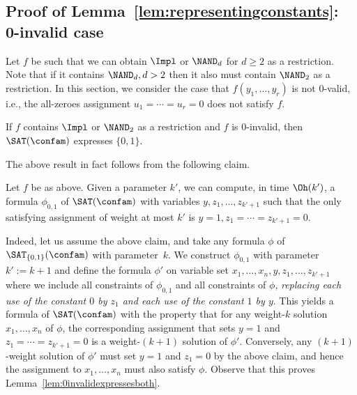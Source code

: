 \subsection{Proof of Lemma~\ref{lem:representingconstants}: 0-invalid case}
\label{sec:0invalid}
%
%
Let $f$ be such that we can obtain $\Impl$ or $\NAND_d$ for $d\ge 2$ as a restriction. Note that if it contains $\NAND_{d},d>2$ then it also must contain $\NAND_2$ as a restriction. 
%
In this section, we consider the case that $f(y_1,\dots,y_r)$ is not $0$-valid, i.e., the all-zeroes assignment $u_1=\cdots = u_r= 0$ does not satisfy $f$.
%
\begin{lem}\label{lem:0invalidexpressesboth}
If $f$ contains $\Impl$ or $\NAND_2$ as a restriction and $f$ is 0-invalid, then $\SAT(\confam)$ expresses $\{0,1\}$.
\end{lem}
%
The above result in fact follows from the following claim.
%
\begin{claim}\label{claim:0invalidconst}
Let $f$ be as above. Given a parameter $k'$, we can compute, in time $\Oh(k')$, a formula $\phi_{0,1}$ of $\SAT(\confam)$ with variables $y, z_1, \dots, z_{k'+1}$ such that the only satisfying assignment of weight at most $k'$ is $y=1, z_1=\cdots = z_{k'+1} = 0$.
\end{claim}
%
Indeed, let us assume the above claim, and take any formula $\phi$ of $\SAT_{\{0,1\}}(\confam)$ with parameter~$k$. We construct $\phi_{0,1}$ with parameter $k':=k+1$ and define the formula $\phi'$ on variable set $x_1,\dots,x_n, y, z_1,\dots, z_{k'+1}$ where we include all constraints of $\phi_{0,1}$ and all constraints of $\phi$, \emph{replacing each use of the constant $0$ by $z_1$ and each use of the constant $1$ by $y$}. This yields a formula of $\SAT(\confam)$ with the property that for any weight-$k$ solution $x_1,\dots,x_n$ of $\phi$, the corresponding assignment that sets $y=1$ and $z_1=\cdots=z_{k'+1} = 0$ is a weight-$(k+1)$ solution of $\phi'$. Conversely, any $(k+1)$-weight solution of $\phi'$ must set $y=1$ and $z_1=0$ by the above claim, and hence the assignment to $x_1,\dots,x_n$ must also satisfy $\phi$. Observe that this proves Lemma~\ref{lem:0invalidexpressesboth}. 
%
